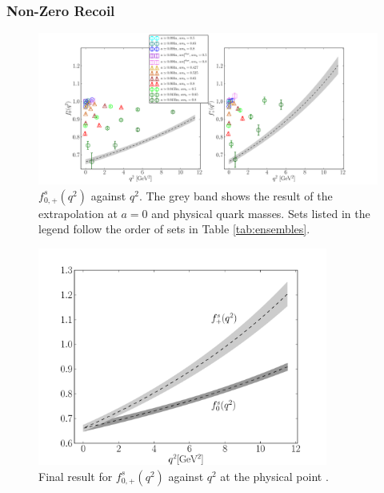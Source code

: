 \subsubsection{Non-Zero Recoil}

\begin{figure}[htb!]
  \hspace{-85pt}
  \includegraphics[width=1.40\textwidth]{images/BsDs/direct/f0fp_vsq2.pdf}
  \caption{ $f_{0,+}^s(q^2)$ against $q^2$. The grey band shows the result of the extrapolation at $a=0$ and physical quark masses. Sets listed in the legend follow the order of sets in Table \ref{tab:ensembles}. \label{fig:directdata}}
\end{figure}

\begin{figure}[htb!]
  \begin{center}
  \includegraphics[width=0.85\textwidth]{images/BsDs/direct/f0fp_final.pdf}
  \caption{ Final result for $f_{0,+}^s(q^2)$ against $q^2$ at the physical point \label{fig:directfinal}.}
    \end{center}
\end{figure}

